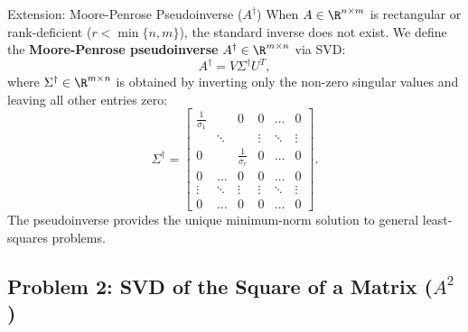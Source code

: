 \begin{noteblock}{Extension: Moore-Penrose Pseudoinverse ($A^\dagger$)}
When $A \in \R^{n \times m}$ is rectangular or rank-deficient ($r < \min\{n, m\}$), the standard inverse does not exist. We define the \textbf{Moore-Penrose pseudoinverse} $A^\dagger \in \R^{m \times n}$ via SVD:
\begin{equation}
    A^\dagger = V \Sigma^\dagger U^T,
\end{equation}
where $\Sigma^\dagger \in \R^{m \times n}$ is obtained by inverting only the non-zero singular values and leaving all other entries zero:
\begin{equation}
    \Sigma^\dagger = \begin{bmatrix}
        \frac{1}{\sigma_1} & & 0 & 0 & \dots & 0 \\
        & \ddots & & \vdots & \ddots & \vdots \\
        0 & & \frac{1}{\sigma_r} & 0 & \dots & 0 \\
        0 & \dots & 0 & 0 & \dots & 0 \\
        \vdots & \ddots & \vdots & \vdots & \ddots & \vdots \\
        0 & \dots & 0 & 0 & \dots & 0
    \end{bmatrix}.
\end{equation}
The pseudoinverse provides the unique minimum-norm solution to general least-squares problems.
\end{noteblock}

\subsection{Problem 2: SVD of the Square of a Matrix (\texorpdfstring{$A^2$}{A\textasciicircum 2})}

